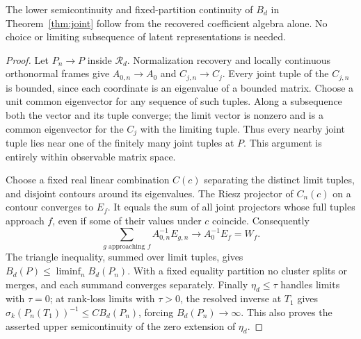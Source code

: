 \begin{lemma}\label{lem:observable-grouping}
The lower semicontinuity and fixed-partition continuity of $B_d$ in
Theorem~\ref{thm:joint} follow from the recovered coefficient algebra
alone. No choice or limiting subsequence of latent representations is
needed.
\end{lemma}
\begin{proof}
Let $P_n\to P$ inside $\mathcal R_d$. Normalization recovery and
locally continuous orthonormal frames give $A_{0,n}\to A_0$ and
$C_{j,n}\to C_j$. Every joint tuple of the $C_{j,n}$ is bounded,
since each coordinate is an eigenvalue of a bounded matrix. Choose a
unit common eigenvector for any sequence of such tuples. Along a
subsequence both the vector and its tuple converge; the limit vector
is nonzero and is a common eigenvector for the $C_j$ with the limiting
tuple. Thus every nearby joint tuple lies near one of the finitely many
joint tuples at $P$. This argument is entirely within observable
matrix space.

Choose a fixed real linear combination $C(c)$ separating the distinct
limit tuples, and disjoint contours around its eigenvalues. The Riesz
projector of $C_n(c)$ on a contour converges to $E_f$. It equals the
sum of all joint projectors whose full tuples approach $f$, even if
some of their values under $c$ coincide. Consequently
\[
 \sum_{g\text{ approaching }f} A_{0,n}^{-1}E_{g,n}
                       \longrightarrow A_0^{-1}E_f=W_f.
\]
The triangle inequality, summed over limit tuples, gives
$B_d(P)\le\liminf_nB_d(P_n)$. With a fixed equality partition no
cluster splits or merges, and each summand converges separately.
Finally $\eta_d\le\tau$ handles limits with $\tau=0$; at rank-loss
limits with $\tau>0$, the resolved inverse at $T_1$ gives
$\sigma_k(P_n(T_1))^{-1}\le CB_d(P_n)$, forcing $B_d(P_n)\to\infty$.
This also proves the asserted upper semicontinuity of the zero
extension of $\eta_d$.
\end{proof}
